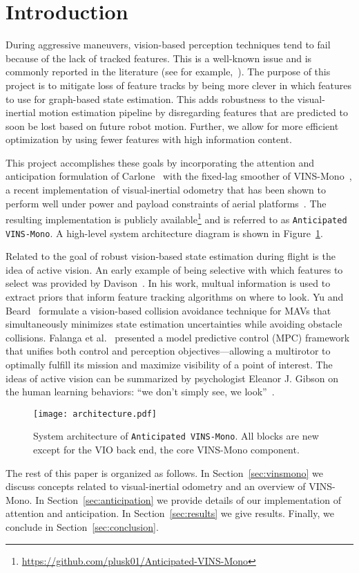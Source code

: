 
\section{Introduction}\label{sec:intro}

During aggressive maneuvers, vision-based perception techniques tend to fail because of the lack of tracked features.
This is a well-known issue and is commonly reported in the literature (see for example,~\cite{Shen2013,Falanga2017}).
The purpose of this project is to mitigate loss of feature tracks by being more clever in which features to use for graph-based state estimation.
This adds robustness to the visual-inertial motion estimation pipeline by disregarding features that are predicted to soon be lost based on future robot motion.
Further, we allow for more efficient optimization by using fewer features with high information content.

This project accomplishes these goals by incorporating the attention and anticipation formulation of Carlone~\cite{Carlone2017} with the fixed-lag smoother of VINS-Mono~\cite{Qin2018}, a recent implementation of visual-inertial odometry that has been shown to perform well under power and payload constraints of aerial platforms~\cite{Delmerico2018}.
The resulting implementation is publicly available\footnote{\url{https://github.com/plusk01/Anticipated-VINS-Mono}} and is referred to as \texttt{Anticipated VINS-Mono}.
A high-level system architecture diagram is shown in Figure~\ref{fig:architecture}.

Related to the goal of robust vision-based state estimation during flight is the idea of active vision.
An early example of being selective with which features to select was provided by Davison~\cite{Davison2005}.
In his work, multual information is used to extract priors that inform feature tracking algorithms on where to look.
Yu and Beard~\cite{Yu2013} formulate a vision-based collision avoidance technique for MAVs that simultaneously minimizes state estimation uncertainties while avoiding obstacle collisions.
Falanga et al.~\cite{Falanga2018} presented a model predictive control (MPC) framework that unifies both control and perception objectives---allowing a multirotor to optimally fulfill its mission and maximize visibility of a point of interest.
The ideas of active vision can be summarized by psychologist Eleanor J. Gibson on the human learning behaviors: ``we don't simply see, we look''~\cite{Gibson1988}.

\begin{figure}
\centering
\texttt{[image: architecture.pdf]} 
\caption{System architecture of \texttt{Anticipated VINS-Mono}. All blocks are new except for the VIO back end, the core VINS-Mono component.}
\label{fig:architecture} 
\end{figure}

The rest of this paper is organized as follows.
In Section~\ref{sec:vinsmono} we discuss concepts related to visual-inertial odometry and an overview of VINS-Mono.
In Section~\ref{sec:anticipation} we provide details of our implementation of attention and anticipation.
In Section~\ref{sec:results} we give results.
Finally, we conclude in Section~\ref{sec:conclusion}.
